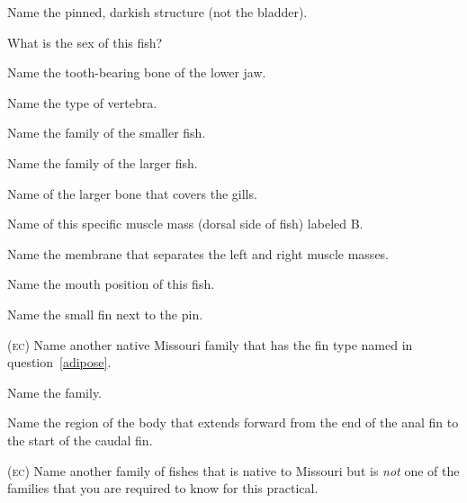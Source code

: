 \documentclass{exam}
\begin{document}
\begin{questions}
{%
\question Name the pinned, darkish structure (not the bladder). 

\question What is the sex of this fish? %
\vspace{2\baselineskip}


\question Name the tooth-bearing bone of the lower jaw.


\question Name the type of vertebra.
\vspace{2\baselineskip}

\question Name the family of the smaller fish.

\question Name the family of the larger fish.
\vspace{2\baselineskip}

\question Name of the larger bone that covers the gills.

\question Name of this specific muscle mass (dorsal side of fish) labeled B.

\question Name the membrane that separates the left and right muscle masses.
\vspace{2\baselineskip}

\question Name the mouth position of this fish.


\question \label{adipose} Name the small fin next to the pin.

\bonusquestion \textsc{(ec)} Name another native Missouri family that has the fin type named in question~\ref{adipose}.
\vspace{2\baselineskip}

\newpage

\question Name the family.

\question Name the region of the body that extends forward from the end of the anal fin to the start of the caudal fin.
\vspace{2\baselineskip}


\bonusquestion \textsc{(ec)} Name another family of fishes that is native to Missouri but is \textit{not} one of the families that you are required to know for this practical. %
\vspace{2\baselineskip}

} %

\end{questions}





\end{document}
